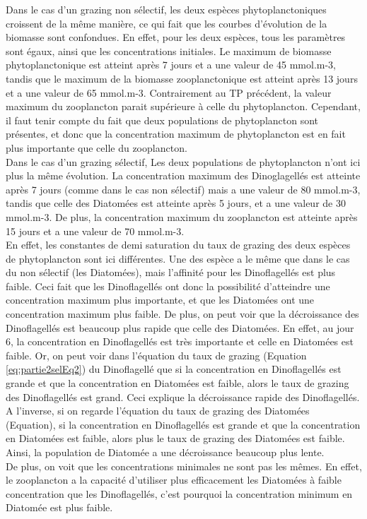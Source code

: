 Dans le cas d'un grazing non s\'electif, les deux espèces phytoplanctoniques croissent de la même manière, ce qui fait que les courbes d'évolution de la biomasse sont confondues. En effet, pour les deux espèces, tous les paramètres sont égaux, ainsi que les concentrations initiales. Le maximum de biomasse phytoplanctonique est atteint après 7 jours et a une valeur de 45 mmol.m-3, tandis que le maximum de la biomasse zooplanctonique est atteint après 13 jours et a une valeur de 65 mmol.m-3. Contrairement au TP précédent, la valeur maximum du zooplancton parait supérieure à celle du phytoplancton. Cependant, il faut tenir compte du fait que deux populations de phytoplancton sont présentes, et donc que la concentration maximum de phytoplancton est en fait plus importante que celle du zooplancton.\\
Dans le cas d'un grazing s\'electif, Les deux populations de phytoplancton n'ont ici plus la même évolution. La concentration maximum des Dinoglagellés est atteinte après 7 jours (comme dans le cas non sélectif) mais a une valeur de 80 mmol.m-3, tandis que celle des Diatomées est atteinte après 5 jours, et a une valeur de 30 mmol.m-3. De plus, la concentration maximum du zooplancton est atteinte après 15 jours et a une valeur de 70 mmol.m-3.\\
En effet, les constantes de demi saturation du taux de grazing des deux espèces de phytoplancton sont ici différentes. Une des espèce a le même que dans le cas du non sélectif (les Diatomées), mais l'affinité pour les Dinoflagellés est plus faible. Ceci fait que les Dinoflagellés ont donc la possibilité d'atteindre une concentration maximum plus importante, et que les Diatomées ont une concentration maximum plus faible. 
De plus, on peut voir que la décroissance des Dinoflagellés est beaucoup plus rapide que celle des Diatomées. En effet, au jour 6, la concentration en Dinoflagellés est très importante et celle en Diatomées est faible. Or, on peut voir dans l'équation du taux de grazing (Equation \ref{eq:partie2selEq2}) du Dinoflagellé que si la concentration en Dinoflagellés est grande et que la concentration en Diatomées est faible, alors le taux de grazing des Dinoflagellés est grand. Ceci explique la décroissance rapide des Dinoflagellés. A l'inverse, si on regarde l'équation du taux de grazing des Diatomées (Equation), si la concentration en Dinoflagellés est grande et que la concentration en Diatomées est faible, alors plus le taux de grazing des Diatomées est faible. Ainsi, la population de Diatomée a une décroissance beaucoup plus lente.\\
De plus, on voit que les concentrations minimales ne sont pas les mêmes. En effet, le zooplancton a la capacité d'utiliser plus efficacement les Diatomées à faible concentration que les Dinoflagellés, c'est pourquoi la concentration minimum en Diatomée est plus faible.


